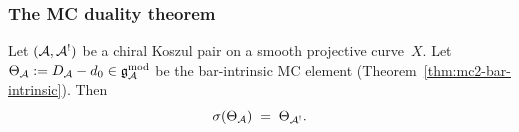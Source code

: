 \subsubsection{The MC duality theorem}

\begin{theorem}
\label{thm:thqg-IV-theta-duality}
Let $(\mathcal{A}, \mathcal{A}^!)$ be a chiral Koszul pair on a smooth projective
curve~$X$. Let
$\Theta_{\mathcal{A}} := D_{\mathcal{A}} - d_0 \in \mathfrak{g}_{\mathcal{A}}^{\mathrm{mod}}$
be the bar-intrinsic MC element
\textup{(}Theorem~\textup{\ref{thm:mc2-bar-intrinsic})}. Then
\begin{equation}\label{eq:thqg-IV-theta-identity}
\sigma(\Theta_{\mathcal{A}}) \;=\; \Theta_{\mathcal{A}^!}.
\end{equation}
\end{theorem}

